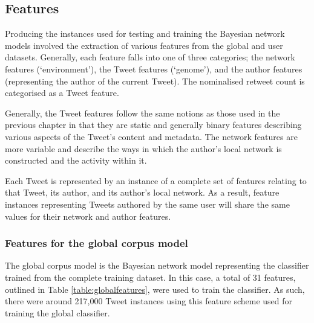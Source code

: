 


\subsection{Features}
Producing the instances used for testing and training the Bayesian network models involved the extraction of various features from the global and user datasets. Generally, each feature falls into one of three categories; the network features (`environment'), the Tweet features (`genome'), and the author features (representing the author of the current Tweet). The nominalised retweet count is categorised as a Tweet feature.

Generally, the Tweet features follow the same notions as those used in the previous chapter in that they are static and generally binary features describing various aspects of the Tweet's content and metadata. The network features are more variable and describe the ways in which the author's local network is constructed and the activity within it.

Each Tweet is represented by an instance of a complete set of features relating to that Tweet, its author, and its author's local network. As a result, feature instances representing Tweets authored by the same user will share the same values for their network and author features.


\subsubsection{Features for the global corpus model}
The global corpus model is the Bayesian network model representing the classifier trained from the complete training dataset. In this case, a total of 31 features, outlined in Table \ref{table:globalfeatures}, were used to train the classifier. As such, there were around 217,000 Tweet instances using this feature scheme used for training the global classifier.

